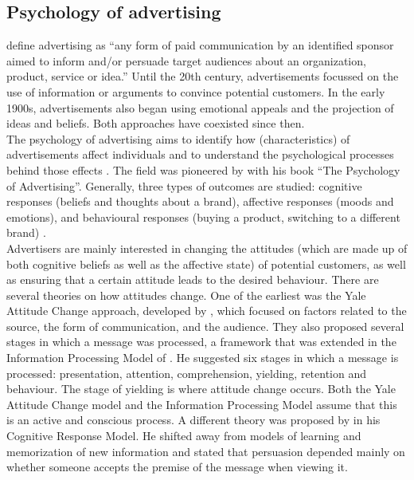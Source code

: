 \subsection{Psychology of advertising}
\cite{Fennis2015} define advertising as “any form of paid communication by an identified sponsor aimed to inform and/or persuade target audiences about an organization, product, service or idea.” Until the 20th century, advertisements focussed on the use of information or arguments to convince potential customers. In the early 1900s, advertisements also began using emotional appeals and the projection of ideas and beliefs. Both approaches have coexisted since then. \\

The psychology of advertising aims to identify how (characteristics) of advertisements affect individuals and to understand the psychological processes behind those effects \citep{Fennis2015}. The field was pioneered by \cite{Scott1916} with his book “The Psychology of Advertising”. Generally, three types of outcomes are studied: cognitive responses (beliefs and thoughts about a brand), affective responses (moods and emotions), and behavioural responses (buying a product, switching to a different brand) \citep{Fennis2015}. \\

Advertisers are mainly interested in changing the attitudes (which are made up of both cognitive beliefs as well as the affective state) of potential customers, as well as ensuring that a certain attitude leads to the desired behaviour. There are several theories on how attitudes change. One of the earliest was the Yale Attitude Change approach, developed by \cite{Hovland1953}, which focused on factors related to the source, the form of communication, and the audience. They also proposed several stages in which a message was processed, a framework that was extended in the Information Processing Model of \cite{McGuire1968}. He suggested six stages in which a message is processed: presentation, attention, comprehension, yielding, retention and behaviour. The stage of yielding is where attitude change occurs. Both the Yale Attitude Change model and the Information Processing Model assume that this is an active and conscious process. A different theory was proposed by \cite{Greenwald1968} in his Cognitive Response Model. He shifted away from models of learning and memorization of new information and stated that persuasion depended mainly on whether someone accepts the premise of the message when viewing it. \\

